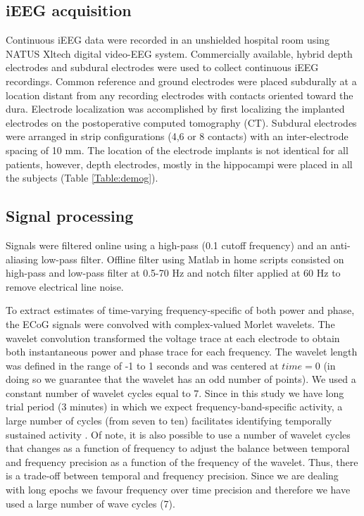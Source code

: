 \documentclass[11pt, onecolumn]{article}
\begin{document}
\subsection{iEEG acquisition}
Continuous iEEG data were recorded in an unshielded hospital room using NATUS Xltech digital video-EEG system.
Commercially available, hybrid depth electrodes and subdural electrodes were used to collect continuous iEEG recordings. Common reference and ground electrodes were placed subdurally at a location distant from any recording electrodes with contacts oriented toward the dura.
Electrode localization was accomplished by first localizing the implanted electrodes on the postoperative computed tomography (CT).
Subdural electrodes were arranged in strip configurations (4,6 or 8 contacts) with an inter-electrode spacing of 10 mm. The location of the electrode implants is not identical for all patients, however, depth electrodes, mostly in the hippocampi were placed in all the subjects (Table \ref{Table:demog}).

\subsection{Signal processing}
Signals were filtered online using a high-pass (0.1 cutoff frequency) and an anti-aliasing low-pass filter. %
Offline filter using Matlab in home scripts consisted on high-pass and low-pass filter at 0.5-70 Hz and notch filter applied at 60 Hz to remove electrical line noise.

To extract estimates of time-varying frequency-specific of both power and phase, the ECoG signals were convolved with complex-valued Morlet wavelets. %
The  wavelet convolution transformed the voltage trace at each electrode to obtain both instantaneous power and phase trace for each frequency.
The wavelet length was defined in the range of -1 to 1 seconds and was centered at $time = 0$ (in doing so we guarantee that the wavelet has an odd number of points). 
We used a constant number of wavelet cycles equal to 7. Since in this study we have long trial period (3 minutes) in which we expect frequency-band-specific activity, a large number of cycles (from seven to ten) facilitates identifying temporally sustained activity \citep{cohen2014analyzing}. Of note, it is also possible to use a number of wavelet cycles that changes as a function of frequency to adjust the balance between temporal and frequency precision as a function of the frequency of the wavelet. Thus, there is a trade-off between temporal and frequency precision. Since we are dealing with long epochs we favour frequency over time precision and therefore we have used a large number of wave cycles (7).
\end{document}
